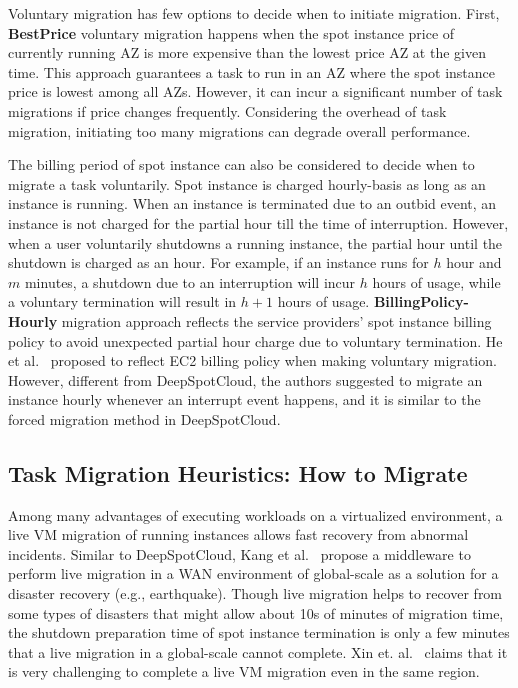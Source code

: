 \documentclass[conference]{IEEEtran}
\begin{document}
Voluntary migration has few options to decide when to initiate migration. First, \textbf{BestPrice} voluntary migration happens when the spot instance price of currently running AZ is more expensive than the lowest price AZ at the given time. This approach guarantees a task to run in an AZ where the spot instance price is lowest among all AZs. However, it can incur a significant number of task migrations if price changes frequently. Considering the overhead of task migration, initiating too many migrations can degrade overall performance.

The billing period of spot instance can also be considered to decide when to migrate a task voluntarily. Spot instance is charged hourly-basis as long as an instance is running. When an instance is terminated due to an outbid event, an instance is not charged for the partial hour till the time of interruption. However, when a user voluntarily shutdowns a running instance, the partial hour until the shutdown is charged as an hour. For example, if an instance runs for $h$ hour and $m$ minutes, a shutdown due to an interruption will incur $h$ hours of usage, while a voluntary termination will result in $h+1$ hours of usage. \textbf{BillingPolicy-Hourly} migration approach reflects the service providers' spot instance billing policy to avoid unexpected partial hour charge due to voluntary termination. He et al.~\cite{spot-server-migrate} proposed to reflect EC2 billing policy when making voluntary migration. However, different from DeepSpotCloud, the authors suggested to migrate an instance hourly whenever an interrupt event happens, and it is similar to the forced migration method in DeepSpotCloud.

\subsection{Task Migration Heuristics: How to Migrate}
Among many advantages of executing workloads on a virtualized environment, a live VM migration of running instances allows fast recovery from abnormal incidents. Similar to DeepSpotCloud, Kang et al.~\cite{live-migration-diaster} propose a middleware to perform live migration in a WAN environment of global-scale as a solution for a disaster recovery (e.g., earthquake). Though live migration helps to recover from some types of disasters that might allow about 10s of minutes of migration time, the shutdown preparation time of spot instance termination is only a few minutes that a live migration in a global-scale cannot complete. Xin et. al.~\cite{spot-server-migrate} claims that it is very challenging to complete a live VM migration even in the same region.
\end{document}

